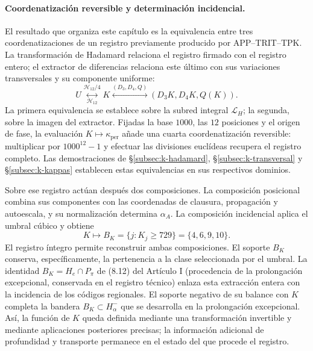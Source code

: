 \paragraph{Coordenatización reversible y determinación incidencial.}
\label{ampl-alfa-k-intro-reversible}
El resultado que organiza este capítulo es la equivalencia entre tres
coordenatizaciones de un registro previamente producido por
APP--TRIT--TPK. La transformación de Hadamard relaciona el registro
firmado con el registro entero; el extractor de diferencias relaciona
este último con sus variaciones transversales y su componente uniforme:
\[
 U\underset{\mathcal H_{12}}{\overset{\mathcal H_{12}/4}{\longleftrightarrow}}K
 \overset{(D_3,D_4,Q)}{\longleftrightarrow}
 (D_3K,D_4K,Q(K)).
\]
La primera equivalencia se establece sobre la subred integral
$\mathcal L_H$; la segunda, sobre la imagen del extractor. Fijadas la
base $1000$, las $12$ posiciones y el origen de fase, la evaluación
$K\mapsto\kappa_{\mathrm{per}}$ añade una cuarta coordenatización
reversible: multiplicar por $1000^{12}-1$ y efectuar las divisiones
euclídeas recupera el registro completo. Las demostraciones de
\S\ref{subsec:k-hadamard}, \S\ref{subsec:k-transversal} y
\S\ref{subsec:k-kappas} establecen estas equivalencias en sus respectivos
dominios.

Sobre ese registro actúan después dos composiciones. La composición
posicional combina sus componentes con las coordenadas de clausura,
propagación y autoescala, y su normalización determina $\alpha_A$. La
composición incidencial aplica el umbral cúbico y obtiene
\[
 K\longmapsto B_K=\{j:K_j\geq729\}=\{4,6,9,10\}.
\]
El registro íntegro permite reconstruir ambas composiciones. El soporte
$B_K$ conserva, específicamente, la pertenencia a la clase seleccionada
por el umbral. La identidad $B_K=H_e\cap P_\pi$ de
(8.12) del Artículo I (procedencia de la prolongación excepcional, conservada en el registro técnico) enlaza esta extracción entera con la incidencia
de los códigos regionales. El soporte negativo de su balance con $K$
completa la bandera $B_K\subset H^-_\alpha$ que se desarrolla en la
prolongación excepcional. Así, la función de $K$ queda definida mediante
una transformación invertible y mediante aplicaciones posteriores
precisas; la información adicional de profundidad y transporte permanece
en el estado del que procede el registro.

